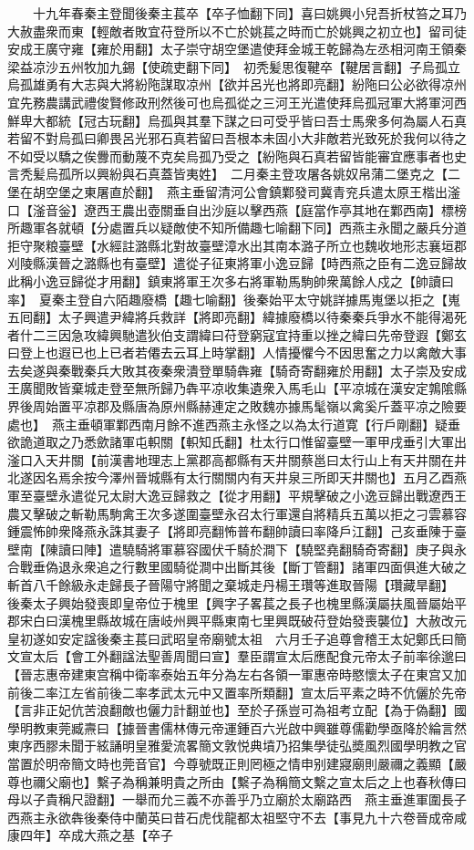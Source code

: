 　　十九年春秦主登聞後秦主萇卒【卒子恤翻下同】喜曰姚興小兒吾折杖笞之耳乃大赦盡衆而東【輕敵者敗宜苻登所以不亡於姚萇之時而亡於姚興之初立也】留司徒安成王廣守雍【雍於用翻】太子崇守胡空堡遣使拜金城王乾歸為左丞相河南王領秦梁益凉沙五州牧加九錫【使疏吏翻下同】　初秃髪思復鞬卒【鞬居言翻】子烏孤立烏孤雄勇有大志與大將紛陁謀取凉州【欲并呂光也將即亮翻】紛陁曰公必欲得凉州宜先務農講武禮俊賢修政刑然後可也烏孤從之三河王光遣使拜烏孤冠軍大將軍河西鮮卑大都統【冠古玩翻】烏孤與其羣下謀之曰可受乎皆曰吾士馬衆多何為屬人石真若留不對烏孤曰卿畏呂光邪石真若留曰吾根本未固小大非敵若光致死於我何以待之不如受以驕之俟釁而動蔑不克矣烏孤乃受之【紛陁與石真若留皆能審宜應事者也史言秃髪烏孤所以興紛與石真蓋皆夷姓】　二月秦主登攻屠各姚奴帛蒲二堡克之【二堡在胡空堡之東屠直於翻】　燕主垂留清河公會鎮鄴發司冀青兖兵遣太原王楷出滏口【滏音釡】遼西王農出壺關垂自出沙庭以擊西燕【庭當作亭其地在鄴西南】標榜所趣軍各就頓【分處置兵以疑敵使不知所備趣七喻翻下同】西燕主永聞之嚴兵分道拒守聚粮臺壁【水經註潞縣北對故臺壁漳水出其南本潞子所立也魏收地形志襄垣郡刈陵縣漢晉之潞縣也有臺壁】遣從子征東將軍小逸豆歸【時西燕之臣有二逸豆歸故此稱小逸豆歸從才用翻】鎮東將軍王次多右將軍勒馬駒帥衆萬餘人戍之【帥讀曰率】　夏秦主登自六陌趣廢橋【趣七喻翻】後秦始平太守姚詳據馬嵬堡以拒之【嵬五囘翻】太子興遣尹緯將兵救詳【將即亮翻】緯據廢橋以待秦秦兵爭水不能得渴死者什二三因急攻緯興馳遣狄伯支謂緯曰苻登窮寇宜持重以挫之緯曰先帝登遐【鄭玄曰登上也遐已也上已者若僊去云耳上時掌翻】人情擾懼今不因思奮之力以禽敵大事去矣遂與秦戰秦兵大敗其夜秦衆潰登單騎犇雍【騎奇寄翻雍於用翻】太子崇及安成王廣聞敗皆棄城走登至無所歸乃犇平凉收集遺衆入馬毛山【平凉城在漢安定鶉隂縣界後周始置平凉郡及縣唐為原州縣赫連定之敗魏亦據馬髦嶺以禽奚斤蓋平凉之險要處也】　燕主垂頓軍鄴西南月餘不進西燕主永怪之以為太行道寛【行戶剛翻】疑垂欲詭道取之乃悉歛諸軍屯軹關【軹知氏翻】杜太行口惟留臺壁一軍甲戌垂引大軍出滏口入天井關【前漢書地理志上黨郡高都縣有天井關蔡邕曰太行山上有天井關在井北遂因名焉余按今澤州晉城縣有太行關關内有天井泉三所即天井關也】五月乙酉燕軍至臺壁永遣從兄太尉大逸豆歸救之【從才用翻】平規擊破之小逸豆歸出戰遼西王農又擊破之斬勒馬駒禽王次多遂圍臺壁永召太行軍還自將精兵五萬以拒之刁雲慕容鍾震怖帥衆降燕永誅其妻子【將即亮翻怖普布翻帥讀曰率降戶江翻】己亥垂陳于臺壁南【陳讀曰陣】遣驍騎將軍慕容國伏千騎於澗下【驍堅堯翻騎奇寄翻】庚子與永合戰垂偽退永衆追之行數里國騎從澗中出斷其後【斷丁管翻】諸軍四面俱進大破之斬首八千餘級永走歸長子晉陽守將聞之棄城走丹楊王瓚等進取晉陽【瓚藏旱翻】　後秦太子興始發喪即皇帝位于槐里【興字子畧萇之長子也槐里縣漢屬扶風晉屬始平郡宋白曰漢槐里縣故城在唐岐州興平縣東南七里興既破苻登始發喪襲位】大赦改元皇初遂如安定諡後秦主萇曰武昭皇帝廟號太祖　六月壬子追尊會稽王太妃鄭氏曰簡文宣太后【會工外翻諡法聖善周聞曰宣】羣臣謂宣太后應配食元帝太子前率徐邈曰【晉志惠帝建東宫稱中衛率泰始五年分為左右各領一軍惠帝時愍懷太子在東宫又加前後二率江左省前後二率孝武太元中又置率所類翻】宣太后平素之時不伉儷於先帝【言非正妃伉苦浪翻敵也儷力計翻並也】至於子孫豈可為祖考立配【為于偽翻】國學明教東莞臧燾曰【據晉書儒林傳元帝運鍾百六光啟中興雖尊儒勸學亟降於綸言然東序西膠未聞于絃誦明皇雅愛流畧簡文敦悦典墳乃招集學徒弘奬風烈國學明教之官當置於明帝簡文時也莞音官】今尊號既正則罔極之情申别建寢廟則嚴禰之義顯【嚴尊也禰父廟也】繫子為稱兼明貴之所由【繫子為稱簡文繫之宣太后之上也春秋傳曰母以子貴稱尺證翻】一舉而允三義不亦善乎乃立廟於太廟路西　燕主垂進軍圍長子西燕主永欲犇後秦侍中蘭英曰昔石虎伐龍都太祖堅守不去【事見九十六卷晉成帝咸康四年】卒成大燕之基【卒子